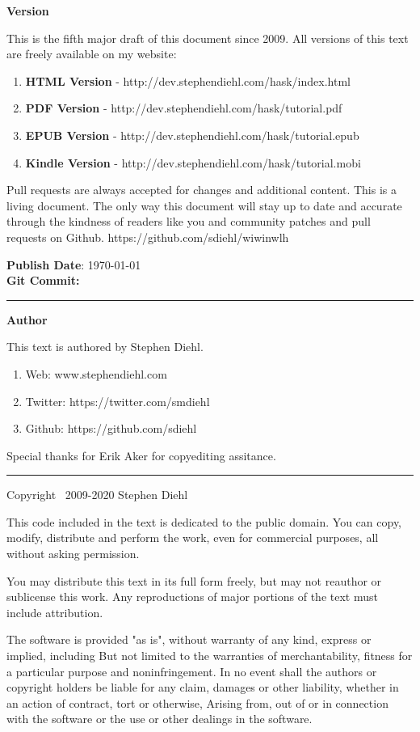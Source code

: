 \Large\textbf{Version}
\normalsize

This is the fifth major draft of this document since 2009. All versions of this
text are freely available on my website:

\begin{enumerate}
\item \textbf{HTML Version}   - http://dev.stephendiehl.com/hask/index.html
\item \textbf{PDF Version}    - http://dev.stephendiehl.com/hask/tutorial.pdf
\item \textbf{EPUB Version}   - http://dev.stephendiehl.com/hask/tutorial.epub
\item \textbf{Kindle Version} - http://dev.stephendiehl.com/hask/tutorial.mobi
\end{enumerate}

Pull requests are always accepted for changes and additional content. This is a
living document.  The only way this document will stay up to date and accurate
through the kindness of readers like you and community patches and pull requests
on Github. https://github.com/sdiehl/wiwinwlh

\textbf{Publish Date}: \today \\
\textbf{Git Commit:} \texttt{}

\par\noindent\rule{\textwidth}{0.4pt}

\Large\textbf{Author}
\normalsize

This text is authored by Stephen Diehl.

\begin{enumerate}
\item Web: www.stephendiehl.com
\item Twitter: https://twitter.com/smdiehl
\item Github: https://github.com/sdiehl
\end{enumerate}

Special thanks for Erik Aker for copyediting assitance.

\par\noindent\rule{\textwidth}{0.4pt}

Copyright \textcopyright \ 2009-2020 Stephen Diehl

This code included in the text is dedicated to the public domain.  You can copy,
modify, distribute and perform the work, even for commercial purposes, all
without asking permission.

You may distribute this text in its full form freely, but may not reauthor or
sublicense this work. Any reproductions of major portions of the text must
include attribution.

The software is provided "as is", without warranty of any kind, express or
implied, including But not limited to the warranties of merchantability, fitness
for a particular purpose and noninfringement. In no event shall the authors or
copyright holders be liable for any claim, damages or other liability, whether
in an action of contract, tort or otherwise, Arising from, out of or in
connection with the software or the use or other dealings in the software.
